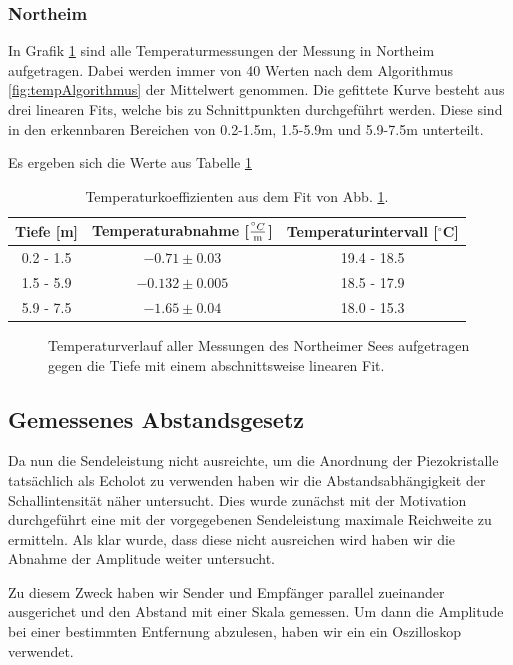 \documentclass[12pt,a4paper,titlepage,headinclude,bibtotoc]{scrartcl}
\numberwithin{equation}{subsection}
\begin{document}
\subsubsection{Northeim}
In Grafik \ref{fig:temp_nor} sind alle Temperaturmessungen der Messung in Northeim aufgetragen.
Dabei werden immer von 40 Werten nach dem Algorithmus \eqref{fig:tempAlgorithmus} der Mittelwert genommen.
Die gefittete Kurve besteht aus drei linearen Fits, welche bis zu Schnittpunkten durchgeführt werden.
Diese sind in den erkennbaren Bereichen von 0.2-1.5m, 1.5-5.9m und 5.9-7.5m unterteilt.

Es ergeben sich die Werte aus Tabelle \ref{tab:tempTabNor}


\begin{table}
\centering
\begin{tabular}{|c||c|c|}
\hline
Tiefe [m] & Temperaturabnahme [$\frac{^\circ C}{\text m}$] & Temperaturintervall [$^\circ$C]\\\hline\hline
0.2 - 1.5 & $-0.71\pm  0.03$	& 19.4 - 18.5 \\
1.5 - 5.9 & $-0.132\pm 0.005$	& 18.5 - 17.9 \\
5.9 - 7.5 & $-1.65\pm 0.04$	& 18.0 - 15.3 \\\hline
\end{tabular}
\caption{Temperaturkoeffizienten aus dem Fit von Abb. \ref{fig:temp_nor}.}
\label{tab:tempTabNor}
\end{table}


\begin{figure}[h]
\centering

\caption{Temperaturverlauf aller Messungen des Northeimer Sees aufgetragen gegen die Tiefe mit einem abschnittsweise linearen Fit.}
\label{fig:temp_nor}
\end{figure}

\subsection{Gemessenes Abstandsgesetz}
Da nun die Sendeleistung nicht ausreichte, um die Anordnung der Piezokristalle tatsächlich als Echolot zu verwenden haben wir die Abstandsabhängigkeit der Schallintensität näher untersucht. 
Dies wurde zunächst mit der Motivation durchgeführt eine mit der vorgegebenen Sendeleistung maximale Reichweite zu ermitteln. Als klar wurde, dass diese nicht ausreichen wird haben wir
die Abnahme der Amplitude weiter untersucht.

Zu diesem Zweck haben wir Sender und Empfänger parallel zueinander ausgerichet und den Abstand mit einer Skala gemessen. Um dann die Amplitude bei einer bestimmten Entfernung abzulesen, haben wir ein
ein Oszilloskop verwendet.
\end{document}
